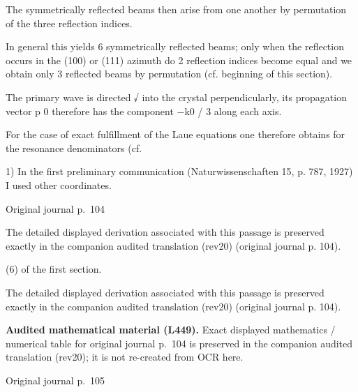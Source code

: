 \documentclass[10pt]{article}
\newcommand{\origpage}[1]{\par\medskip\noindent\hfill{\small\color{notegray}Original journal p.~#1}\hfill\mbox{}\par\smallskip}
\newcommand{\mathref}[2]{\par\smallskip\noindent\colorbox{gray!8}{\parbox{0.95\linewidth}{\small\color{notegray}\textbf{Audited mathematical material (L#1).} Exact displayed mathematics / numerical table for original journal p.~#2 is preserved in the companion audited translation (rev20); it is not re-created from OCR here.}}\par\smallskip}
\begin{document}
The symmetrically reflected beams then arise from one another by permutation of the three reflection indices.\par
In general this yields 6 symmetrically reflected beams; only when the reflection occurs in the (100) or (111) azimuth do 2 reflection indices become equal and we obtain only 3 reflected beams by permutation (cf. beginning of this section).\par
The primary wave is directed √ into the crystal perpendicularly, its propagation vector p 0 therefore has the component −k0 / 3 along each axis.\par
For the case of exact fulfillment of the Laue equations one therefore obtains for the resonance denominators (cf.\par
\noindent\footnotesize 1) In the first preliminary communication (Naturwissenschaften 15, p. 787, 1927) I used other coordinates.\par\normalsize
\origpage{104}
The detailed displayed derivation associated with this passage is preserved exactly in the companion audited translation (rev20) (original journal p. 104).\par
(6) of the first section.\par
The detailed displayed derivation associated with this passage is preserved exactly in the companion audited translation (rev20) (original journal p. 104).\par
\mathref{449}{104}
\origpage{105}
\end{document}
